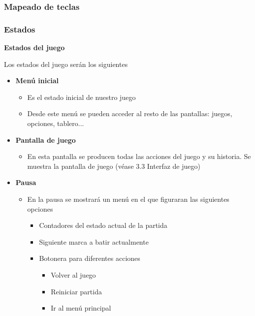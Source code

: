 \documentclass[a4paper]{article}
\begin{document}
\subsubsection{Mapeado de teclas}




\subsubsection{Estados}

\textbf{Estados del juego}

Los estados del juego serán los siguientes
\begin{itemize}
    \item \textbf{Menú inicial}
        \begin{itemize}
            \item Es el estado inicial de nuestro juego
            \item Desde este menú se pueden acceder al resto de las pantallas: juegos, opciones, tablero...
        \end{itemize}
    \item \textbf{Pantalla de juego}
        \begin{itemize}
            \item En esta pantalla se producen todas las acciones del juego y su historia. Se muestra la pantalla de juego (véase 3.3 Interfaz de juego)
        \end{itemize}
    \item \textbf{Pausa}
        \begin{itemize}
            \item En la pausa se mostrará un menú en el que figuraran las siguientes opciones
                \begin{itemize}
                    \item Contadores del estado actual de la partida
                    \item Siguiente marca a batir actualmente
                    \item Botonera para diferentes acciones 
                         \begin{itemize}
                            \item Volver al juego
                            \item Reiniciar partida
                            \item Ir al menú principal
                        \end{itemize}
                \end{itemize}

\end{itemize}
\end{itemize}
\end{document}
